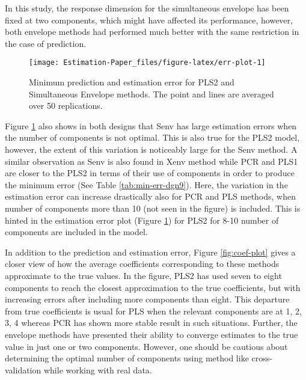 \documentclass[12pt,3p,authoryear]{elsarticle}
\begin{document}
In this study, the response dimension for the simultaneous envelope has been fixed at two components, which might have affected its performance, however, both envelope methods had performed much better with the same restriction in the case of prediction.

\begin{figure}
\texttt{[image: Estimation-Paper\_files/figure-latex/err-plot-1]} \caption{Minimum prediction and estimation error for PLS2 and Simultaneous Envelope methods. The point and lines are averaged over 50 replications.}\label{fig:err-plot}
\end{figure}

Figure \ref{fig:err-plot} also shows in both designs that Senv has large estimation errors when the number of components is not optimal. This is also true for the PLS2 model, however, the extent of this variation is noticeably large for the Senv method. A similar observation as Senv is also found in Xenv method while PCR and PLS1 are closer to the PLS2 in terms of their use of components in order to produce the minimum error (See Table \ref{tab:min-err-dgn9}). Here, the variation in the estimation error can increase drastically also for PCR and PLS methods, when number of components more than 10 (not seen in the figure) is included. This is hinted in the estimation error plot (Figure \ref{fig:err-plot}) for PLS2 for 8-10 number of components are included in the model.

In addition to the prediction and estimation error, Figure \ref{fig:coef-plot} gives a closer view of how the average coefficients corresponding to these methods approximate to the true values. In the figure, PLS2 has used seven to eight components to reach the closest approximation to the true coefficients, but with increasing errors after including more components than eight. This departure from true coefficients is usual for PLS when the relevant components are at 1, 2, 3, 4 whereas PCR has shown more stable result in such situations. Further, the envelope methods have presented their ability to converge estimates to the true value in just one or two components. However, one should be cautious about determining the optimal number of components using method like cross-validation while working with real data.
\end{document}
